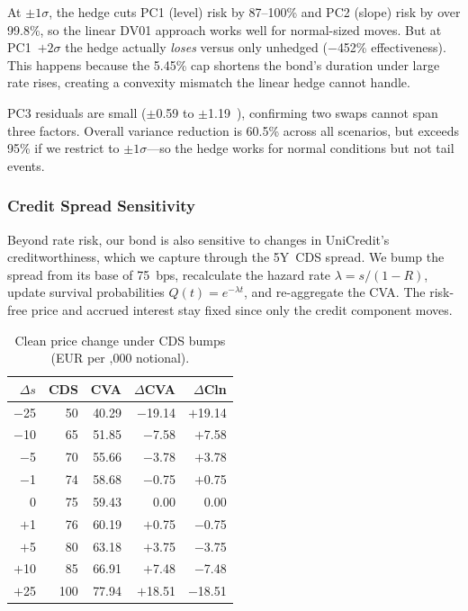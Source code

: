 \documentclass[11pt,a4paper]{article}
\begin{document}
At $\pm 1\sigma$, the hedge cuts PC1 (level) risk by 87--100\% and
PC2 (slope) risk by over 99.8\%, so the linear DV01 approach works
well for normal-sized moves.  But at PC1~$+2\sigma$ the hedge
actually \emph{loses}  versus only 
unhedged ($-$452\% effectiveness).  This happens because the 5.45\%
cap shortens the bond's duration under large rate rises, creating a
convexity mismatch the linear hedge cannot handle.

PC3 residuals are small ($\pm$0.59 to $\pm$1.19~\texteuro{}), confirming
two swaps cannot span three factors.  Overall variance reduction is
60.5\% across all scenarios, but exceeds 95\% if we restrict to
$\pm 1\sigma$---so the hedge works for normal conditions but not
tail events.

\subsubsection{Credit Spread Sensitivity}
\label{sssec:q15_cs_dv01}

Beyond rate risk, our bond is also sensitive to changes in UniCredit's
creditworthiness, which we capture through the 5Y~CDS spread.  We bump
the spread from its base of 75~bps, recalculate the hazard rate
$\lambda = s/(1{-}R)$, update survival probabilities $Q(t)=e^{-\lambda t}$,
and re-aggregate the CVA.  The risk-free price and accrued interest
stay fixed since only the credit component moves.

\begin{table}
  \vspace{-12pt}
  \centering\scriptsize
  \setlength{\tabcolsep}{2pt}
  \begin{tabular}{@{}rrrrr@{}}
    \toprule
    \textbf{$\Delta s$} & \textbf{CDS}
      & \textbf{CVA} & \textbf{$\Delta$CVA}
      & \textbf{$\Delta$Cln} \\
    \midrule
    $-$25 &  50 & 40.29 & $-$19.14 & $+$19.14 \\
    $-$10 &  65 & 51.85 & $-$7.58  & $+$7.58 \\
     $-$5 &  70 & 55.66 & $-$3.78  & $+$3.78 \\
     $-$1 &  74 & 58.68 & $-$0.75  & $+$0.75 \\
        0 &  75 & 59.43 &     0.00 &     0.00 \\
     $+$1 &  76 & 60.19 & $+$0.75  & $-$0.75 \\
     $+$5 &  80 & 63.18 & $+$3.75  & $-$3.75 \\
    $+$10 &  85 & 66.91 & $+$7.48  & $-$7.48 \\
    $+$25 & 100 & 77.94 & $+$18.51 & $-$18.51 \\
    \bottomrule
  \end{tabular}
  \vspace{2pt}
  \caption{Clean price change under CDS bumps
    (EUR per ,000 notional).}
  \label{tab:q15_cs}
  \vspace{-8pt}
\end{table}
\end{document}

